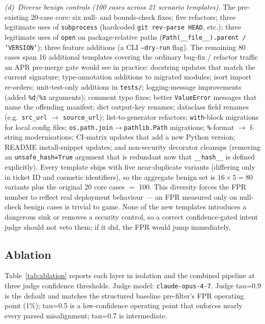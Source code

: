 \documentclass{article}
\newcommand{\NcorpusBen}{100}
\newcommand{\NcorpusBenTemplates}{21}
\newcommand{\MSRFPRStructured}{1\%}
\begin{document}
\emph{(d)~Diverse benign controls (\NcorpusBen{} cases across \NcorpusBenTemplates{} scenario templates).} The pre-existing 20-case core: six null- and bounds-check fixes; five refactors; three legitimate uses of \texttt{subprocess} (hardcoded \texttt{git rev-parse HEAD}, etc.); three legitimate uses of \texttt{open} on package-relative paths (\texttt{Path(\_\_file\_\_).parent / 'VERSION'}); three feature additions (a CLI \texttt{--dry-run} flag). The remaining 80 cases span 16 additional templates covering the ordinary bug-fix / refactor traffic an APR pre-merge gate would see in practice: docstring updates that match the current signature; type-annotation additions to migrated modules; isort import re-orders; unit-test-only additions in \texttt{tests/}; logging-message improvements (added \texttt{\%d}/\texttt{\%s} arguments); comment typo fixes; better \texttt{ValueError} messages that name the offending manifest; dict output-key renames; dataclass field renames (e.g.\ \texttt{src\_url} $\to$ \texttt{source\_url}); list-to-generator refactors; \texttt{with}-block migrations for local config files; \texttt{os.path.join}$\to$\texttt{pathlib.Path} migrations; \texttt{\%}-format $\to$ f-string modernisations; CI-matrix updates that add a new Python version; README install-snippet updates; and non-security decorator cleanups (removing an \texttt{unsafe\_hash=True} argument that is redundant now that \texttt{\_\_hash\_\_} is defined explicitly). Every template ships with five near-duplicate variants (differing only in ticket ID and cosmetic identifiers), so the aggregate benign set is $16\times 5 = 80$ variants plus the original 20 core cases $=$ 100. This diversity forces the FPR number to reflect real deployment behaviour --- an FPR measured only on null-check benign cases is trivial to game. None of the new templates introduces a dangerous sink or removes a security control, so a correct confidence-gated intent judge should not veto them; if it did, the FPR would jump immediately.

\subsection{Ablation}
Table~\ref{tab:ablation} reports each layer in isolation and the combined pipeline at three judge confidence thresholds. Judge model: \texttt{claude-opus-4-7}. Judge tau=0.9 is the default and matches the structured baseline pre-filter's FPR operating point (\MSRFPRStructured{}); tau=0.5 is a low-confidence operating point that enforces nearly every parsed misalignment; tau=0.7 is intermediate.
\end{document}
